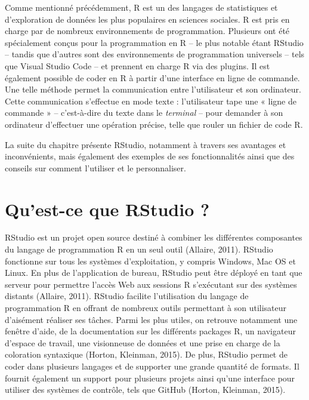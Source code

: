 \documentclass[
  letterpaper,
]{scrbook}
\begin{document}
Comme mentionné précédemment, R est un des langages de statistiques et
d'exploration de données les plus populaires en sciences sociales. R est
pris en charge par de nombreux environnements de programmation.
Plusieurs ont été spécialement conçus pour la programmation en R -- le
plus notable étant RStudio -- tandis que d'autres sont des
environnements de programmation universels -- tels que Visual Studio
Code -- et prennent en charge R via des plugins. Il est également
possible de coder en R à partir d'une interface en ligne de commande.
Une telle méthode permet la communication entre l'utilisateur et son
ordinateur. Cette communication s'effectue en mode texte : l'utilisateur
tape une « ligne de commande » -- c'est-à-dire du texte dans le
\emph{terminal} -- pour demander à son ordinateur d'effectuer une
opération précise, telle que rouler un fichier de code R.

La suite du chapitre présente RStudio, notamment à travers ses avantages
et inconvénients, mais également des exemples de ses fonctionnalités
ainsi que des conseils sur comment l'utiliser et le personnaliser.

\hypertarget{quest-ce-que-rstudio}{%
\section{Qu'est-ce que RStudio ?}\label{quest-ce-que-rstudio}}

RStudio est un projet open source destiné à combiner les différentes
composantes du langage de programmation R en un seul outil (Allaire,
2011). RStudio fonctionne sur tous les systèmes d'exploitation, y
compris Windows, Mac OS et Linux. En plus de l'application de bureau,
RStudio peut être déployé en tant que serveur pour permettre l'accès Web
aux sessions R s'exécutant sur des systèmes distants (Allaire, 2011).
RStudio facilite l'utilisation du langage de programmation R en offrant
de nombreux outils permettant à son utilisateur d'aisément réaliser ses
tâches. Parmi les plus utiles, on retrouve notamment une fenêtre d'aide,
de la documentation sur les différents packages R, un navigateur
d'espace de travail, une visionneuse de données et une prise en charge
de la coloration syntaxique (Horton, Kleinman, 2015). De plus, RStudio
permet de coder dans plusieurs langages et de supporter une grande
quantité de formats. Il fournit également un support pour plusieurs
projets ainsi qu'une interface pour utiliser des systèmes de contrôle,
tels que GitHub (Horton, Kleinman, 2015).
\end{document}
